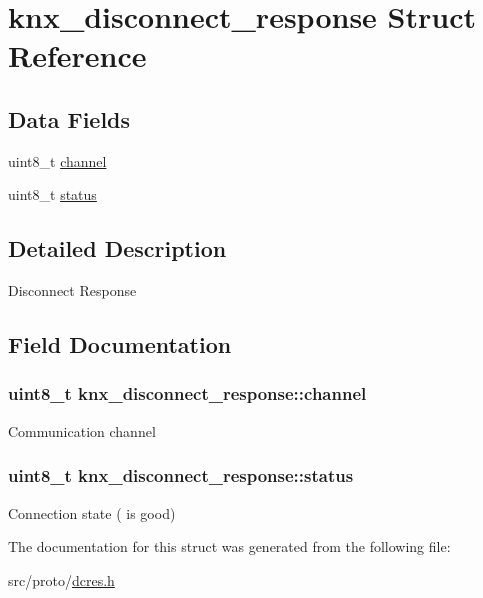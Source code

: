 \hypertarget{structknx__disconnect__response}{}\section{knx\+\_\+disconnect\+\_\+response Struct Reference}
\label{structknx__disconnect__response}
\subsection*{Data Fields}
\begin{DoxyCompactItemize}
\item 
uint8\+\_\+t \hyperlink{structknx__disconnect__response_af445fc89853870098ce30648e5ac4c62}{channel}
\item 
uint8\+\_\+t \hyperlink{structknx__disconnect__response_a4fa48860adb8864e2191afd5c20b9988}{status}
\end{DoxyCompactItemize}


\subsection{Detailed Description}
Disconnect Response 

\subsection{Field Documentation}
\subsubsection[{\texorpdfstring{channel}{channel}}]{\setlength{\rightskip}{0pt plus 5cm}uint8\+\_\+t knx\+\_\+disconnect\+\_\+response\+::channel}\hypertarget{structknx__disconnect__response_af445fc89853870098ce30648e5ac4c62}{}\label{structknx__disconnect__response_af445fc89853870098ce30648e5ac4c62}
Communication channel 
\subsubsection[{\texorpdfstring{status}{status}}]{\setlength{\rightskip}{0pt plus 5cm}uint8\+\_\+t knx\+\_\+disconnect\+\_\+response\+::status}\hypertarget{structknx__disconnect__response_a4fa48860adb8864e2191afd5c20b9988}{}\label{structknx__disconnect__response_a4fa48860adb8864e2191afd5c20b9988}
Connection state ({} is good) 

The documentation for this struct was generated from the following file\+:\begin{DoxyCompactItemize}
\item 
src/proto/\hyperlink{dcres_8h}{dcres.\+h}\end{DoxyCompactItemize}
